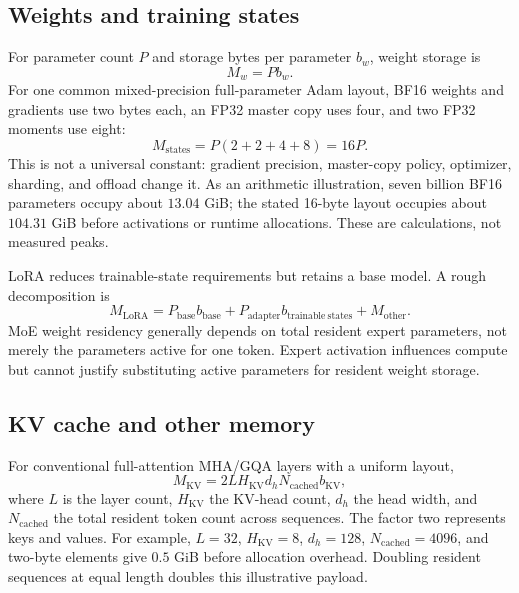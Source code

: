 \documentclass[10pt]{article}
\begin{document}
\subsection{Weights and training states}
For parameter count $P$ and storage bytes per parameter $b_w$, weight storage is
\begin{equation}
M_w=P b_w.
\end{equation}
For one common mixed-precision full-parameter Adam layout, BF16 weights and gradients use two bytes each, an FP32 master copy uses four, and two FP32 moments use eight:
\begin{equation}
M_{\mathrm{states}}=P(2+2+4+8)=16P.
\end{equation}
This is not a universal constant: gradient precision, master-copy policy, optimizer, sharding, and offload change it. As an arithmetic illustration, seven billion BF16 parameters occupy about $13.04$ GiB; the stated 16-byte layout occupies about $104.31$ GiB before activations or runtime allocations. These are calculations, not measured peaks.

LoRA reduces trainable-state requirements but retains a base model. A rough decomposition is
\begin{equation}
M_{\mathrm{LoRA}}=P_{\mathrm{base}}b_{\mathrm{base}}+
P_{\mathrm{adapter}}b_{\mathrm{trainable\ states}}+M_{\mathrm{other}}.
\end{equation}
MoE weight residency generally depends on total resident expert parameters, not merely the parameters active for one token. Expert activation influences compute but cannot justify substituting active parameters for resident weight storage.

\subsection{KV cache and other memory}
For conventional full-attention MHA/GQA layers with a uniform layout,
\begin{equation}
M_{\mathrm{KV}}=2 L H_{\mathrm{KV}} d_h N_{\mathrm{cached}} b_{\mathrm{KV}},
\end{equation}
where $L$ is the layer count, $H_{\mathrm{KV}}$ the KV-head count, $d_h$ the head width, and $N_{\mathrm{cached}}$ the total resident token count across sequences. The factor two represents keys and values. For example, $L=32$, $H_{\mathrm{KV}}=8$, $d_h=128$, $N_{\mathrm{cached}}=4096$, and two-byte elements give $0.5$ GiB before allocation overhead. Doubling resident sequences at equal length doubles this illustrative payload.
\end{document}
